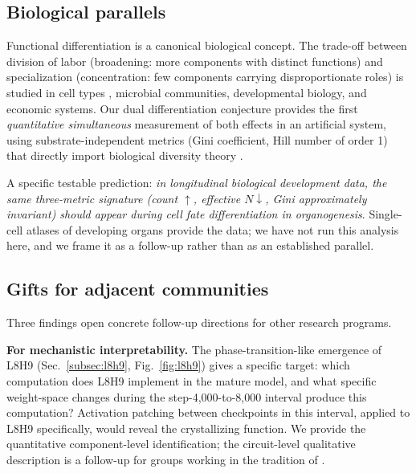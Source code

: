 \documentclass{article}
\begin{document}
\subsection{Biological parallels}

Functional differentiation is a canonical biological concept. The trade-off between division of labor (broadening: more components with distinct functions) and specialization (concentration: few components carrying disproportionate roles) is studied in cell types \citep{wagner2014arrival}, microbial communities, developmental biology, and economic systems. Our dual differentiation conjecture provides the first \emph{quantitative simultaneous} measurement of both effects in an artificial system, using substrate-independent metrics (Gini coefficient, Hill number of order 1) that directly import biological diversity theory \citep{hill1973diversity, jost2006entropy}.

A specific testable prediction: \emph{in longitudinal biological development data, the same three-metric signature (count $\uparrow$, effective $N \downarrow$, Gini approximately invariant) should appear during cell fate differentiation in organogenesis}. Single-cell atlases of developing organs provide the data; we have not run this analysis here, and we frame it as a follow-up rather than as an established parallel.

\subsection{Gifts for adjacent communities}

Three findings open concrete follow-up directions for other research programs.

\textbf{For mechanistic interpretability.} The phase-transition-like emergence of L8H9 (Sec.~\ref{subsec:l8h9}, Fig.~\ref{fig:l8h9}) gives a specific target: which computation does L8H9 implement in the mature model, and what specific weight-space changes during the step-4{,}000-to-8{,}000 interval produce this computation? Activation patching between checkpoints in this interval, applied to L8H9 specifically, would reveal the crystallizing function. We provide the quantitative component-level identification; the circuit-level qualitative description is a follow-up for groups working in the tradition of \citet{olsson2022induction, wang2023interpretability, conmy2023automated}.
\end{document}
